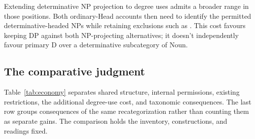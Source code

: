 \documentclass[12pt]{article}
\begin{document}
Extending determinative NP projection to degree uses admits a broader range in those positions. Both ordinary-Head accounts then need to identify the permitted determinative-headed NPs while retaining exclusions such as . This cost favours keeping DP against both NP-projecting alternatives; it doesn't independently favour primary D over a determinative subcategory of Noun.

\subsection{The comparative judgment}\label{sec:costs}

Table~\ref{tab:economy} separates shared structure, internal permissions, existing restrictions, the additional degree-use cost, and taxonomic consequences. The last row groups consequences of the same recategorization rather than counting them as separate gains. The comparison holds the inventory, constructions, and readings fixed.
\end{document}
